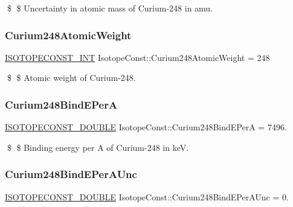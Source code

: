 \$ \$ Uncertainty in atomic mass of Curium-\/248 in amu. \mbox{\label{group___isotope_const-_curium-_cm248_ga0acc7de7545de7df3c218f8d32aa2d1e}} 
\subsubsection{\texorpdfstring{Curium248\+Atomic\+Weight}{Curium248AtomicWeight}}
{\footnotesize\ttfamily \mbox{\hyperlink{group___isotope_const-_macros_ga5f18360b3e99483a35c32d789e62621c}{I\+S\+O\+T\+O\+P\+E\+C\+O\+N\+S\+T\+\_\+\+I\+NT}} Isotope\+Const\+::\+Curium248\+Atomic\+Weight = 248}

\$ \$ Atomic weight of Curium-\/248. \mbox{\label{group___isotope_const-_curium-_cm248_ga32750dac35d0b29344a09b8d96aab582}} 
\subsubsection{\texorpdfstring{Curium248\+Bind\+E\+PerA}{Curium248BindEPerA}}
{\footnotesize\ttfamily \mbox{\hyperlink{group___isotope_const-_macros_ga8f45a7272ce02c0b4c65c44636ed719a}{I\+S\+O\+T\+O\+P\+E\+C\+O\+N\+S\+T\+\_\+\+D\+O\+U\+B\+LE}} Isotope\+Const\+::\+Curium248\+Bind\+E\+PerA = 7496.}

\$ \$ Binding energy per A of Curium-\/248 in keV. \mbox{\label{group___isotope_const-_curium-_cm248_gae619b6d174bc5507975f5b5ac396a721}} 
\subsubsection{\texorpdfstring{Curium248\+Bind\+E\+Per\+A\+Unc}{Curium248BindEPerAUnc}}
{\footnotesize\ttfamily \mbox{\hyperlink{group___isotope_const-_macros_ga8f45a7272ce02c0b4c65c44636ed719a}{I\+S\+O\+T\+O\+P\+E\+C\+O\+N\+S\+T\+\_\+\+D\+O\+U\+B\+LE}} Isotope\+Const\+::\+Curium248\+Bind\+E\+Per\+A\+Unc = 0.}

